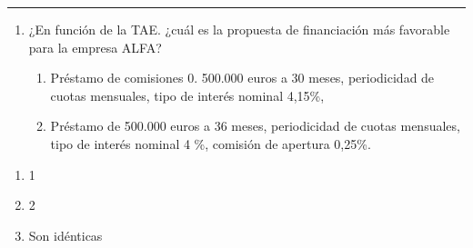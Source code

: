 \documentclass[
  letterpaper,
  DIV=11,
  numbers=noendperiod]{scrartcl}
\begin{document}
\begin{center}\rule{0.5\linewidth}{0.5pt}\end{center}

\begin{enumerate}
\def\labelenumi{\arabic{enumi}.}
\setcounter{enumi}{2}
\item
  ¿En función de la TAE. ¿cuál es la propuesta de financiación más
  favorable para la empresa ALFA?

  \begin{enumerate}
  \def\labelenumii{\arabic{enumii}.}
  \item
    Préstamo de comisiones 0. 500.000 euros a 30 meses, periodicidad de
    cuotas mensuales, tipo de interés nominal 4,15\%,
  \item
    Préstamo de 500.000 euros a 36 meses, periodicidad de cuotas
    mensuales, tipo de interés nominal 4 \%, comisión de apertura
    0,25\%.
  \end{enumerate}
\end{enumerate}

\begin{enumerate}
\def\labelenumi{\alph{enumi}.}
\item
  1
\item
  2
\item
  Son idénticas
\end{enumerate}
\end{document}
